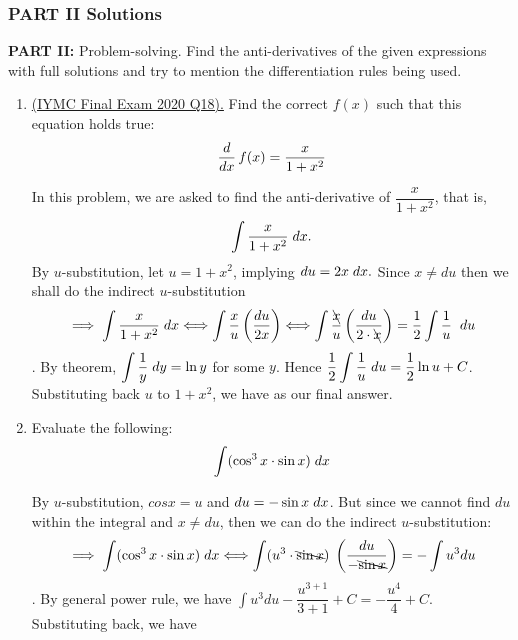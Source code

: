 \documentclass[10pt,paper=letter]{scrartcl}
\begin{document}
\subsubsection{PART II Solutions} 


\raggedright \textbf{PART II:} Problem-solving. Find the anti-derivatives of the given expressions with full solutions and try to mention the differentiation rules being used.

\begin{enumerate}[resume, label=\arabic*.,font=\bfseries]

\item \textsf{\href{https://iymc.info/docs/problems/2020/Final-Exam-2020.pdf}{(IYMC Final Exam 2020 Q18).}}  Find the correct $f(x)$ such that this equation holds true: $$\frac{d}{dx}\, f(x) = \dfrac{x}{1+x^2}$$


\sol In this problem, we are asked to find the anti-derivative of $\dfrac{x}{1 + x^2}$, that is, $$\int \dfrac{x}{1+x^2} \hspace{1mm} dx.$$ By $u$-substitution, let $u=1+x^2$, implying $du = 2x \hspace{1mm} dx.$ Since $x \neq du$ then we shall do the indirect $u$-substitution $$\implies \int \dfrac{x}{1+x^2} \hspace{1mm} dx \Longleftrightarrow \int \dfrac{{x}}{u}  \left(\dfrac{du}{2x}\right) \Longleftrightarrow \int \dfrac{\bcancel{x}}{u}  \left(\dfrac{du}{2 \cdot \bcancel{x}}\right) = \dfrac{1}{2}\int \dfrac{1}{u} \hspace{2mm} du$$. By theorem, $\displaystyle{\int \dfrac{1}{y} \hspace{1mm} dy = \ln y}$ for some $y$. Hence $\displaystyle{\dfrac{1}{2} \int \dfrac{1}{u} \hspace{1mm} du = \dfrac{1}{2} \ln u + C}$. Substituting back $u$ to $1 + x^2$, we have  as our final answer.


\item Evaluate the following: $$\int (\cos^3 x \cdot \sin x) \hspace{1mm} dx $$


\sol By $u$-substitution, $cos x = u$ and $du = -\sin x \hspace{1mm} dx$. But since we cannot find $du$ within the integral and $x \neq du$, then we can do the indirect $u$-substitution: 
$$ \implies \int (\cos^3 x \cdot \sin x) \hspace{1mm} dx \Longleftrightarrow \int (u^3  \cdot \bcancel{\sin x}) \hspace{1mm} \left(\dfrac{du}{-\bcancel{\sin x}}\right) = - \int u^3 du $$. By general power rule, we have $\displaystyle{\int u^3 du} -\dfrac{u^{3+1}}{3+1} + C = -\dfrac{u^4}{4} + C$. Substituting back, we have 



\end{enumerate}
\end{document}

